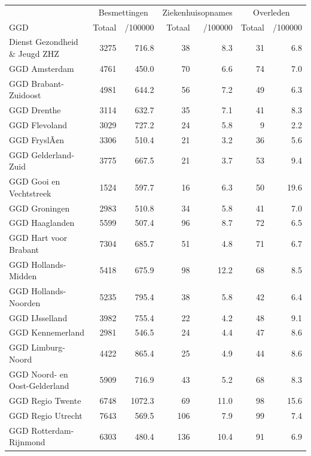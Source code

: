 \documentclass[
  english,
  man,floatsintext]{apa6}
\begin{document}
\begin{table}[H]
\centering\begingroup\fontsize{10}{12}\selectfont

\begin{threeparttable}
\begin{tabular}{lrrrrrr}
\toprule
\multicolumn{1}{c}{ } & \multicolumn{2}{c}{Besmettingen} & \multicolumn{2}{c}{Ziekenhuisopnames} & \multicolumn{2}{c}{Overleden} \\
\cmidrule(l{3pt}r{3pt}){2-3} \cmidrule(l{3pt}r{3pt}){4-5} \cmidrule(l{3pt}r{3pt}){6-7}
GGD & Totaal & /100000 & Totaal & /100000 & Totaal & /100000\\
\midrule
Dienst Gezondheid \& Jeugd ZHZ & 3275 & 716.8 & 38 & 8.3 & 31 & 6.8\\
GGD Amsterdam & 4761 & 450.0 & 70 & 6.6 & 74 & 7.0\\
GGD Brabant-Zuidoost & 4981 & 644.2 & 56 & 7.2 & 49 & 6.3\\
GGD Drenthe & 3114 & 632.7 & 35 & 7.1 & 41 & 8.3\\
GGD Flevoland & 3029 & 727.2 & 24 & 5.8 & 9 & 2.2\\
GGD FryslÃ¢n & 3306 & 510.4 & 21 & 3.2 & 36 & 5.6\\
GGD Gelderland-Zuid & 3775 & 667.5 & 21 & 3.7 & 53 & 9.4\\
GGD Gooi en Vechtstreek & 1524 & 597.7 & 16 & 6.3 & 50 & 19.6\\
GGD Groningen & 2983 & 510.8 & 34 & 5.8 & 41 & 7.0\\
GGD Haaglanden & 5599 & 507.4 & 96 & 8.7 & 72 & 6.5\\
GGD Hart voor Brabant & 7304 & 685.7 & 51 & 4.8 & 71 & 6.7\\
GGD Hollands-Midden & 5418 & 675.9 & 98 & 12.2 & 68 & 8.5\\
GGD Hollands-Noorden & 5235 & 795.4 & 38 & 5.8 & 42 & 6.4\\
GGD IJsselland & 3982 & 755.4 & 22 & 4.2 & 48 & 9.1\\
GGD Kennemerland & 2981 & 546.5 & 24 & 4.4 & 47 & 8.6\\
GGD Limburg-Noord & 4422 & 865.4 & 25 & 4.9 & 44 & 8.6\\
GGD Noord- en Oost-Gelderland & 5909 & 716.9 & 43 & 5.2 & 68 & 8.3\\
GGD Regio Twente & 6748 & 1072.3 & 69 & 11.0 & 98 & 15.6\\
GGD Regio Utrecht & 7643 & 569.5 & 106 & 7.9 & 99 & 7.4\\
GGD Rotterdam-Rijnmond & 6303 & 480.4 & 136 & 10.4 & 91 & 6.9\\

\end{tabular}
\end{threeparttable}
\end{table}
\end{document}

